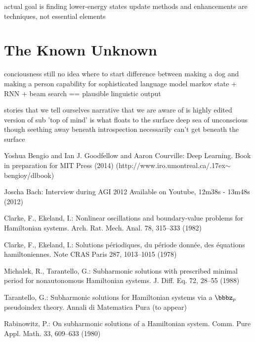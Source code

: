 \documentclass[citeauthoryear]{llncs}
\begin{document}
    actual goal is finding lower-energy states
      update methods and enhancements are techniques, not essential elements


\section{The Known Unknown}

conciousness 
  still no idea where to start
  difference between making a dog and making a person
    capability for sophisticated language model
      markov state + RNN + beam search == plausible linguistic output
  
  stories that we tell ourselves
    narrative that we are aware of is highly edited version of sub
      'top of mind' is what floats to the surface
      deep sea of unconscious though seething away beneath
  introspection necessarily can't get beneath the surface

%
%
\begin{thebibliography}{5}
%


Yoshua Bengio and Ian J. Goodfellow and Aaron Courville:
Deep Learning.
Book in preparation for MIT Press (2014)
\newcommand{\mytilde}{\raise.17ex\hbox{$\scriptstyle\mathtt{\sim}$}}
(http://www.iro.umontreal.ca/\mytilde{}bengioy/dlbook)

Joscha Bach:
Interview during AGI 2012
Available on Youtube, 12m38s - 13m48s (2012)


Clarke, F., Ekeland, I.:
Nonlinear oscillations and
boundary-value problems for Hamiltonian systems.
Arch. Rat. Mech. Anal. 78, 315--333 (1982)

Clarke, F., Ekeland, I.:
Solutions p\'{e}riodiques, du
p\'{e}riode donn\'{e}e, des \'{e}quations hamiltoniennes.
Note CRAS Paris 287, 1013--1015 (1978)

Michalek, R., Tarantello, G.:
Subharmonic solutions with prescribed minimal
period for nonautonomous Hamiltonian systems.
J. Diff. Eq. 72, 28--55 (1988)

Tarantello, G.:
Subharmonic solutions for Hamiltonian
systems via a $\bbbz_{p}$ pseudoindex theory.
Annali di Matematica Pura (to appear)

Rabinowitz, P.:
On subharmonic solutions of a Hamiltonian system.
Comm. Pure Appl. Math. 33, 609--633 (1980)

\end{thebibliography}
\end{document}
